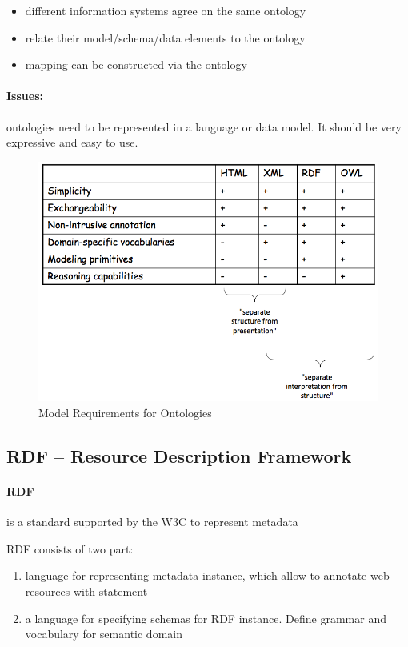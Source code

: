 \begin{itemize}
	\item different information systems agree on the same ontology
	\item relate their model/schema/data elements to the ontology
	\item mapping can be constructed via the ontology
\end{itemize}

\paragraph{Issues:} ontologies need to be represented in a language or data model. It should be very expressive and easy to use.

\begin{figure}[H]
\begin{center}
\includegraphics[width=1\linewidth]{figures/ontology.png}
\end{center}
\caption{Model Requirements for Ontologies}
\end{figure}


\subsection{RDF -- Resource Description Framework}

\paragraph{RDF} is a standard supported by the W3C to represent metadata

RDF consists of two part:
\begin{enumerate}
\item language for representing metadata instance, which allow to annotate web resources with statement
\item a language for specifying schemas for RDF instance. Define grammar and vocabulary for semantic domain
\end{enumerate}

